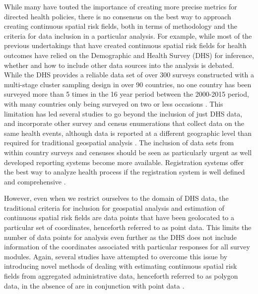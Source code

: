 \documentclass{article}
\begin{document}
While many have touted the importance of creating more precise metrics for directed health policies\cite{Bhutta2016, Desmond-Hellmann2016}, there is no consensus on the best way to approach creating continuous spatial risk fields, both in terms of methodology and the criteria for data inclusion in a particular analysis. For example, while most of the previous undertakings that have created continuous spatial risk fields for health outcomes have relied on the Demographic and Health Survey (DHS) for inference, whether and how to include other data sources into the analysis is debated. While the DHS provides a reliable data set of over 300 surveys constructed with a multi-stage cluster sampling design in over 90 countries, no one country has been surveyed more than 5 times in the 16 year period between the 2000-2015 period, with many countries only being surveyed on two or less occasions \cite{Burgert-Brucker2016, Gething2015}. This limitation has led several studies to go beyond the inclusion of just DHS data, and incorporate other survey and census enumerations that collect data on the same health events, although data is reported at a different geographic level than required for traditional geospatial analysis \cite{Golding2017, Reiner2018}. The inclusion of data sets from within country surveys and censuses should be seen as particularly urgent as well developed reporting systems become more available. Registration systems offer the best way to analyze health process if the registration system is well defined and comprehensive \cite{AbouZahr2015}.

However, even when we restrict ourselves to the domain of DHS data, the traditional criteria for inclusion for geospatial analysis and estimation of continuous spatial risk fields are data points that have been geolocated to a particular set of coordinates, henceforth referred to as point data. This limits the number of data points for analysis even further as the DHS does not include information of the coordinates associated with particular responses for all survey modules. Again, several studies have attempted to overcome this issue by introducing novel methods of dealing with estimating continuous spatial risk fields from aggregated administrative data, henceforth referred to as polygon data, in the absence of are in conjunction with point data \cite{Golding2017, Reiner2018, Utazi2018a}. 
\end{document}
